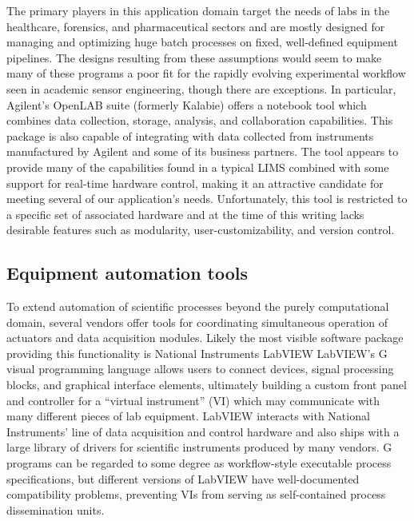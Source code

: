 \documentclass[../thesis]{subfiles}
\begin{document}
The primary players in this application domain target the needs of
labs in the healthcare, forensics, and pharmaceutical sectors and are
mostly designed for managing and optimizing huge batch processes on
fixed, well-defined equipment pipelines. The designs resulting from
these assumptions would seem to make many of these programs a poor fit
for the rapidly evolving experimental workflow seen in academic sensor
engineering, though there are exceptions.
In particular, Agilent's OpenLAB suite (formerly Kalabie)
\cite{OpenLAB} offers a notebook tool which combines data collection,
storage, analysis, and collaboration capabilities. This package is
also capable of integrating with data collected from instruments
manufactured by Agilent and some of its business partners. The tool
appears to provide many of the capabilities found in a typical
\gls{LIMS} combined with some support for real-time hardware control,
making it an attractive candidate for meeting several of our
application's needs. Unfortunately, this tool is restricted to a
specific set of associated hardware and at the time of this writing
lacks desirable features such as modularity, user-customizability, and
version control.



\subsection{Equipment automation tools}

To extend automation of scientific processes beyond the purely
computational domain, several vendors offer tools for coordinating
simultaneous operation of actuators and data acquisition modules.
Likely the most visible software package providing this functionality
is National Instruments LabVIEW \cite{ELLIOTT2007}
LabVIEW's G visual programming language allows users to connect
devices, signal processing blocks, and graphical interface elements,
ultimately building a custom front panel and controller for a
``virtual instrument'' (VI) which may communicate with many different
pieces of lab equipment. LabVIEW interacts with National Instruments'
line of data acquisition and control hardware and also ships with a
large library of drivers for scientific instruments produced by many
vendors. G programs can be regarded to some degree as workflow-style
executable process specifications, but different versions of LabVIEW
have well-documented compatibility problems, preventing VIs from
serving as self-contained process dissemination units.
\end{document}
